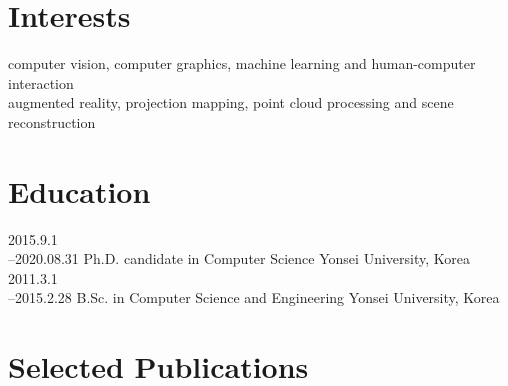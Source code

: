 \documentclass[]{friggeri-cv}
\begin{document}

\section{Interests}

computer vision, computer graphics, machine learning and human-computer interaction\\
augmented reality, projection mapping, point cloud processing and scene reconstruction

\section{Education}

\begin{entrylist}
  \entry
    {2015.9.1\\--2020.08.31}
    {Ph.D. {\normalfont candidate in Computer Science}}
    {Yonsei University, Korea}
    {}
  \entry
    {2011.3.1\\--2015.2.28}
    {B.Sc. {\normalfont in Computer Science and Engineering}}
    {Yonsei University, Korea}
    {}
\end{entrylist}

\section{Selected Publications}

\begin{refsection}
  \nocite{*}
  \printbibliography[
    type=article, 
    title=\textbf{Journal articles}, 
    heading=subbibliography
  ]
\end{refsection}

\begin{refsection}
  \nocite{*}
  \printbibliography[
    type=inproceedings, 
    title=\textbf{Conference proceedings}, 
    heading=subbibliography,
    keyword={selected}
  ]
\end{refsection}
\end{document}
